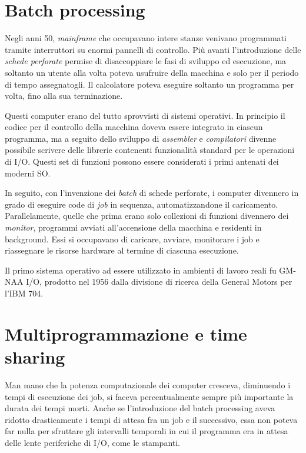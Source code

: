 \documentclass[12pt,a4paper]{report}
\begin{document}
	\section{Batch processing}
		Negli anni 50, \emph{mainframe} che occupavano intere stanze venivano programmati tramite interruttori su enormi pannelli di controllo.
		Più avanti l'introduzione delle \emph{schede perforate} permise di disaccoppiare le fasi di sviluppo
		ed esecuzione, ma soltanto un utente alla volta poteva usufruire della macchina e solo per il periodo di tempo assegnatogli.
		Il calcolatore poteva eseguire soltanto un programma per volta, fino alla sua terminazione.
		
		Questi computer erano del tutto sprovvisti di sistemi operativi. In principio il codice per il controllo della macchina doveva
		essere integrato in ciascun programma, ma a seguito dello sviluppo di \emph{assembler} e \emph{compilatori} divenne
		possibile scrivere delle librerie contenenti funzionalità standard per le operazioni di I/O.
		Questi set di funzioni possono essere considerati i primi antenati dei moderni SO.
		
		In seguito, con l'invenzione dei \emph{batch} di schede perforate, i computer divennero in grado di eseguire
		code di \emph{job} in sequenza, automatizzandone il caricamento. Parallelamente, quelle che prima erano
		solo collezioni di funzioni divennero dei \emph{monitor}, programmi avviati all'accensione della macchina e
		residenti in background. Essi si occupavano di caricare, avviare, monitorare i job e riassegnare le risorse
		hardware al termine di ciascuna esecuzione.
		
		Il primo sistema operativo ad essere utilizzato in ambienti di lavoro reali fu GM-NAA I/O, prodotto
		nel 1956 dalla divisione di ricerca della General Motors per l'IBM 704.
		
	\section{Multiprogrammazione e time sharing}
		Man mano che la potenza computazionale dei computer cresceva, diminuendo i tempi di esecuzione dei job, si faceva
		percentualmente sempre più importante la durata dei tempi morti. Anche se l'introduzione del batch processing aveva
		ridotto drasticamente i tempi di attesa fra un job e il successivo, essa non poteva far nulla per sfruttare gli intervalli
		temporali in cui il programma era in attesa delle lente periferiche di I/O, come le stampanti.
		
\end{document}

